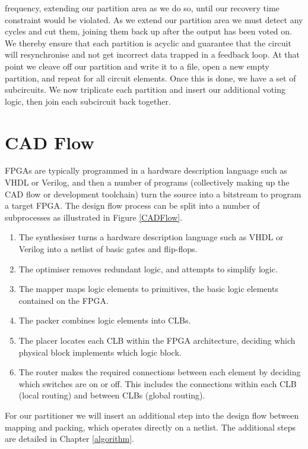\documentclass[12pt,final,oneside]{dwThesis} %
\begin{document}
   frequency, extending our partition area as we do so, until our recovery time
   constraint would be violated.  As we extend our partition area we must
   detect any cycles and cut them, joining them back up after the output has
   been voted on. We thereby ensure that each partition is acyclic and
   guarantee that the circuit will resynchronise and not get incorrect data
   trapped in a feedback loop.  At that point we cleave off our partition and
   write it to a file, open a new empty partition, and repeat for all circuit
   elements.  Once this is done, we have a set of subcircuits. We now
   triplicate each partition and insert our additional voting logic, then join
   each subcircuit back together.

   \section{\gls{CAD}
      Flow} \glspl{FPGA} are typically programmed
   in a hardware description language such as \gls{VHDL} or Verilog, and then a
   number of programs (collectively making up the \gls{CAD} flow or development
   toolchain) turn the source into a bitstream to program a target \gls{FPGA}.
   The design flow process can be split into a number of
   subprocesses as illustrated in Figure
   \ref{CADFlow}\cite{VPRBook,VPRManual,FPGAArch}.  
   \begin{enumerate}

      \item The synthesiser turns a hardware description language such as VHDL
         or Verilog into a netlist of basic gates and flip-flops.
      \item The optimiser removes redundant logic, and attempts to simplify
         logic.
      \item The mapper maps logic elements to \glspl{primitive}, the basic
         logic elements contained on the \gls{FPGA}.
      \item The packer combines logic elements into \glspl{CLB}.
      \item The placer locates each \gls{CLB} within the \gls{FPGA}
         architecture, deciding which physical block implements which logic
         block.
      \item The router makes the required connections between each element by
         deciding which switches are on or off. This includes the
         connections within each \gls{CLB} (local routing) and between
         \glspl{CLB} (global routing).  
   \end{enumerate}
   For our partitioner
   we will insert an additional step into the design flow between mapping
   and packing, which operates directly on a netlist. The additional steps
   are detailed in Chapter \ref{algorithm}.
\end{document}
